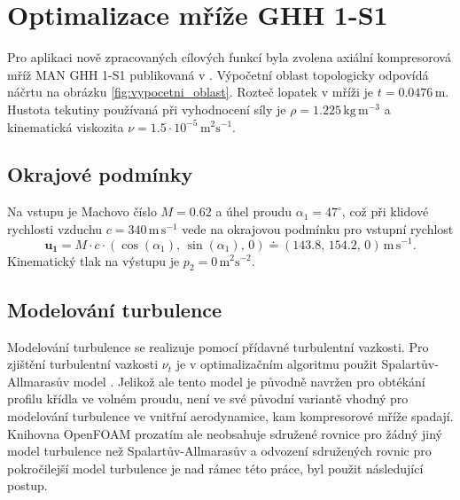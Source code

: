 \section{Optimalizace mříže GHH 1-S1}
Pro aplikaci nově zpracovaných cílových funkcí byla zvolena axiální kompresorová mříž MAN GHH 1-S1 publikovaná v \cite{steinert1990design}.
Výpočetní oblast topologicky odpovídá náčrtu na obrázku \ref{fig:vypocetni_oblast}.
Rozteč lopatek v mříži je $ t=0.0476\,\mathrm{m} $. Hustota tekutiny používaná při vyhodnocení síly je $ \rho=1.225\,\mathrm{kg\,m^{-3}} $ a kinematická viskozita $ \nu = 1.5\cdot10^{-5} \, \mathrm{m^2s^{-1}} $.

\subsection{Okrajové podmínky}  Na vstupu je Machovo číslo $ M=0.62 $ a úhel proudu $ \alpha_1 = 47^\circ $, což při klidové rychlosti vzduchu $ c=340 \,\mathrm{m\,s^{-1}} $ vede na okrajovou podmínku pro vstupní rychlost  
\begin{equation}
\mathbf{u_1}=M\cdot c \cdot (\cos(\alpha_1),\, \sin(\alpha_1),\, 0) \doteq (143.8,\, 154.2,\, 0)\, \mathrm{m\,s^{-1}}.
\end{equation}
Kinematický tlak na výstupu je $ p_2=0\,\mathrm{m^2s^{-2}} $.

\subsection{Modelování turbulence}
Modelování turbulence se realizuje pomocí přídavné turbulentní vazkosti. Pro zjištění turbulentní vazkosti $ \nu_t $ je v optimalizačním algoritmu použit Spalartův-Allmarasův model \cite{spalart1992one}. Jelikož ale tento model je původně navržen pro obtékání profilu křídla ve volném proudu, není ve své původní variantě vhodný pro modelování turbulence ve vnitřní aerodynamice, kam kompresorové mříže spadají. Knihovna OpenFOAM prozatím ale neobsahuje sdružené rovnice pro žádný jiný model turbulence než Spalartův-Allmarasův a odvození sdružených rovnic pro pokročilejší model turbulence je nad rámec této práce, byl použit následující postup. 

